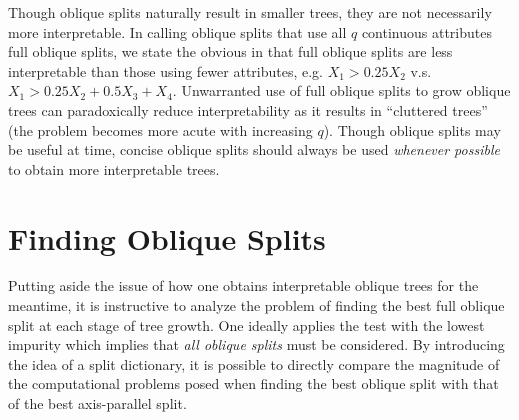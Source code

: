 Though oblique splits naturally result in smaller trees, they are not necessarily more interpretable. In calling oblique splits that use all $q$ continuous attributes full oblique splits, we state the obvious in that full oblique splits are less interpretable than those using fewer attributes, e.g. $X_1>0.25 X_2$ v.s. $X_1>0.25 X_2+0.5 X_3+X_4$. Unwarranted use of full oblique splits to grow oblique trees can paradoxically reduce interpretability as it results in ``cluttered trees'' (the problem becomes more acute with increasing $q$). Though oblique splits may be useful at time, concise oblique splits should always be used \emph{whenever possible} to obtain more interpretable trees.

\section{Finding Oblique Splits}
\label{FindingObliqueSplits}
Putting aside the issue of how one obtains interpretable oblique trees for the meantime, it is instructive to analyze the problem of finding the best full oblique split at each stage of tree growth. One ideally applies the test with the lowest impurity which implies that \emph{all oblique splits} must be considered. By introducing the idea of a split dictionary, it is possible to directly compare the magnitude of the computational problems posed when finding the best oblique split with that of the best axis-parallel split. \\

